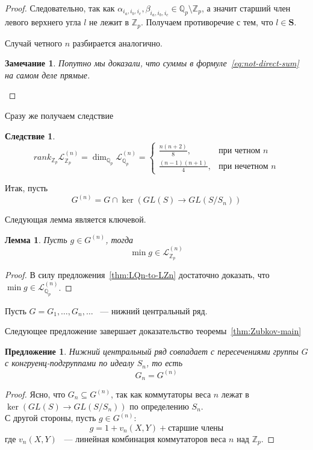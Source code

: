 \documentclass[12pt,a4paper]{article}
\newtheorem{remark}{Замечание}[section]
\newtheorem{lemma}{Лемма}[section]
\newtheorem{proposition}{Предложение}[section]
\newtheorem{colloraly}{Следствие}[section]
\newcommand{\Z}{\ensuremath{\mathbb{Z}}}
\newcommand{\Q}{\ensuremath{\mathbb{Q}}}
\newcommand{\LQn}{\ensuremath{\mathcal{L}^{(n)}_{\mathbb{Q}_p}}}
\newcommand{\LZn}{\ensuremath{\mathcal{L}^{(n)}_{\mathbb{Z}_p}}}
\newcommand{\Sbf}{\ensuremath{\mathbf{S}}}
\begin{document}
\begin{proof}
        Следовательно, так как $\alpha_{i_a,i_b,i_c}, \beta_{i_a,i_b,i_c} \in \Q_p\setminus \Z_p$, а значит старший член левого верхнего угла $l$ не лежит в $\Z_p$.
        Получаем противоречие с тем, что $l\in \Sbf$.

        Случай четного $n$ разбирается аналогично.
        \begin{remark}
            Попутно мы доказали, что суммы в формуле~\eqref{eq:not-direct-sum} на самом деле прямые.
        \end{remark}
    \end{proof}

    Сразу же получаем следствие
    \begin{colloraly}
        \label{thm:LZn-rank}
        \[
            rank_{\Z_p} \LZn = \dim_{\Q_p} \LQn =
            \begin{cases}
                \frac{n(n+2)}{8}, & \text{при четном $n$} \\
                \frac{(n-1)(n+1)}{4}, & \text{при нечетном $n$}
            \end{cases}
        \]
    \end{colloraly}


    Итак, пусть
    \[
        G^{(n)} = G \cap \ker{(GL(S) \to GL(S / S_n))}
    \]

    Следующая лемма является ключевой.
    \begin{lemma}
        Пусть $g\in G^{(n)}$, тогда
        \[
            \min g \in \LZn
        \]
    \end{lemma}
    \begin{proof}
        В силу предложения~\ref{thm:LQn-to-LZn} достаточно доказать, что
        $\min g \in \LQn$.


    \end{proof}

    Пусть $G=G_1,\ldots,G_n,\ldots$ ~--- нижний центральный ряд.

    Следующее предложение завершает доказательство теоремы~\ref{thm:Zubkov-main}
    \begin{proposition}
        Нижний центральный ряд совпадает с пересечениями группы $G$ с конгруенц-подгруппами по идеалу $S_n$, то есть
        \[
            G_n = G^{(n)}
        \]
    \end{proposition}
    \begin{proof}
        Ясно, что $G_n \subseteq G^{(n)}$, так как коммутаторы веса $n$ лежат в $\ker{(GL(S) \to GL(S / S_n))}$ по определению $S_n$.\\
        С другой стороны, пусть $g\in G^{(n)}$:
        \[
            g = 1 + v_n(X, Y) + \text{старшие члены}
        \]
        где $v_n(X,Y)$ ~--- линейная комбинация коммутаторов веса $n$ над $\Z_p$.

    \end{proof}
\end{document}
